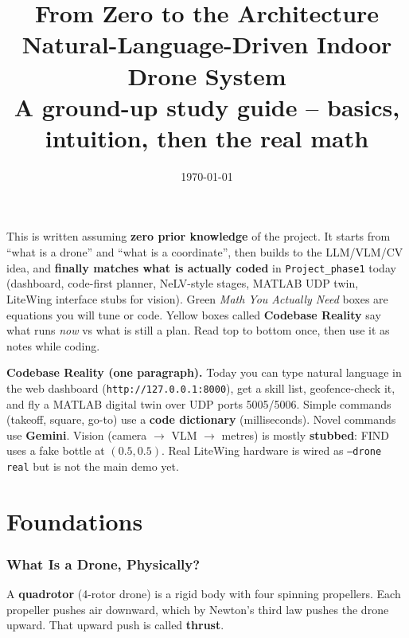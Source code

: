 \documentclass[11pt,a4paper]{article}
\title{\vspace{-1.5cm}\textbf{\color{navy} From Zero to the Architecture}\\[4pt]
\Large\color{steel} Natural-Language-Driven Indoor Drone System\\[2pt]
\large\color{steel!70!black} A ground-up study guide -- basics, intuition, then the real math}
\author{}
\date{\small\today}
\begin{document}
\maketitle
\thispagestyle{fancy}

\begin{keyidea}[title={\textbf{How to use this document}}]
This is written assuming \textbf{zero prior knowledge} of the project. It starts from
``what is a drone'' and ``what is a coordinate'', then builds to the LLM/VLM/CV idea, and
\textbf{finally matches what is actually coded} in \texttt{Project\_phase1} today (dashboard,
code-first planner, NeLV-style stages, MATLAB UDP twin, LiteWing interface stubs for vision).
Green \textit{Math You Actually Need} boxes are equations you will tune or code. Yellow boxes
called \textbf{Codebase Reality} say what runs \emph{now} vs what is still a plan.
Read top to bottom once, then use it as notes while coding.
\end{keyidea}

\begin{quotebox}
\textbf{Codebase Reality (one paragraph).}
Today you can type natural language in the web dashboard
(\texttt{http://127.0.0.1:8000}), get a skill list, geofence-check it, and fly a MATLAB digital
twin over UDP ports 5005/5006. Simple commands (takeoff, square, go-to) use a \textbf{code
dictionary} (milliseconds). Novel commands use \textbf{Gemini}. Vision (camera $\to$ VLM
$\to$ metres) is mostly \textbf{stubbed}: FIND uses a fake bottle at $(0.5,0.5)$. Real LiteWing
hardware is wired as \texttt{--drone real} but is not the main demo yet.
\end{quotebox}

\tableofcontents

\part{Foundations}

\section{What Is a Drone, Physically?}

A \textbf{quadrotor} (4-rotor drone) is a rigid body with four spinning propellers. Each
propeller pushes air downward, which by Newton's third law pushes the drone upward. That
upward push is called \textbf{thrust}.
\end{document}
